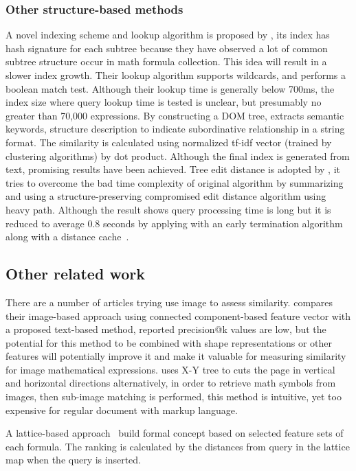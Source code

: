 \subsubsection*{Other structure-based methods}
A novel indexing scheme and lookup algorithm is proposed by \cite{newretrievalsystem}, its index has hash signature for each subtree because they have observed a lot of common subtree structure occur in math formula collection. This idea will result in a slower index growth. Their lookup algorithm supports wildcards, and performs a boolean match test. Although their lookup time is generally below 700ms, the index size where query lookup time is tested is unclear, but presumably no greater than 70,000 expressions.
By constructing a DOM tree, \cite{DOMextraction} extracts semantic keywords, structure description to indicate subordinative relationship in a string format. The similarity is calculated using normalized tf-idf vector (trained by clustering algorithms) by dot product. Although the final index is generated from text, promising results have been achieved.  
Tree edit distance is adopted by \cite{editdisXML11}, it tries to overcome the bad time complexity of original algorithm by summarizing and using a structure-preserving compromised edit distance algorithm using heavy path. Although the result shows query processing time is long but it is reduced to average 0.8 seconds by applying with an early termination algorithm along with a distance cache~\cite{editdisXML13}.

\subsection{Other related work}
There are a number of articles trying use image to assess similarity. \cite{imageb11} compares their image-based approach using connected component-based feature vector with a proposed text-based method, reported precision@k values are low, but the potential for this method to be combined with shape representations or other features will potentially improve it and make it valuable for measuring similarity for image mathematical expressions. \cite{handwrite} uses \mbox{X-Y} tree to cuts the page in vertical and horizontal directions alternatively, in order to retrieve math symbols from images, then sub-image matching is performed, this method is intuitive, yet too expensive for regular document with markup language.

A lattice-based approach~\cite{lattice} build formal concept based on selected feature sets of each formula. The ranking is calculated by the distances from query in the lattice map when the query is inserted. 

